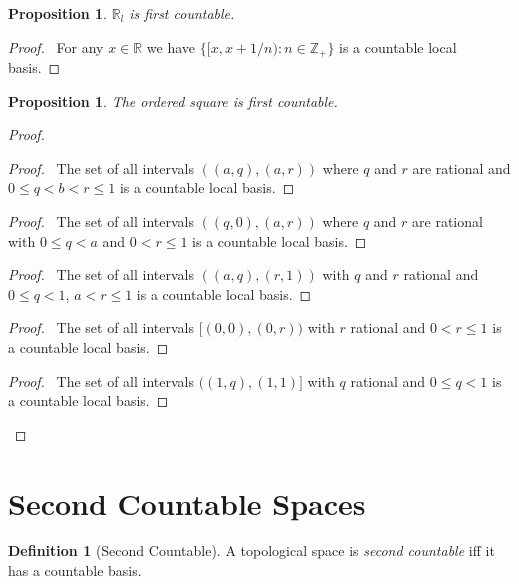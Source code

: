 \documentclass{book}
\let\qed\relax
\newtheorem{prop}[ax]{Proposition}
\theoremstyle{definition}
\newtheorem{df}[ax]{Definition}
\begin{document}
\begin{prop}
$\mathbb{R}_l$ is first countable.
\end{prop}

\begin{proof}
\pf\ For any $x \in \mathbb{R}$ we have $\{ [x, x + 1/n) : n \in \mathbb{Z}_+ \}$ is a countable local basis. \qed
\end{proof}

\begin{prop}
The ordered square is first countable.
\end{prop}

\begin{proof}
\pf
{}
\begin{proof}
	\pf\ The set of all intervals $((a,q),(a,r))$ where $q$ and $r$ are rational and $0 \leq q < b < r \leq 1$ is a countable local basis.
\end{proof}
\begin{proof}
	\pf\ The set of all intervals $((q,0),(a,r))$ where $q$ and $r$ are rational with $0 \leq q < a$ and $0 < r \leq 1$ is a countable local basis.
\end{proof}
\begin{proof}
	\pf\ The set of all intervals $((a,q),(r,1))$ with $q$ and $r$ rational and $0 \leq q < 1$, $a < r \leq 1$ is a countable local basis.
\end{proof}
\begin{proof}
	\pf\ The set of all intervals $[(0,0),(0,r))$ with $r$ rational and $0 < r \leq 1$ is a countable local basis.
\end{proof}
\begin{proof}
	\pf\ The set of all intervals $((1,q),(1,1)]$ with $q$ rational and $0 \leq q < 1$ is a countable local basis.
\end{proof}
\qed
\end{proof}
\section{Second Countable Spaces}

\begin{df}[Second Countable]
A topological space is \emph{second countable} iff it has a countable basis.
\end{df}
\end{document}
